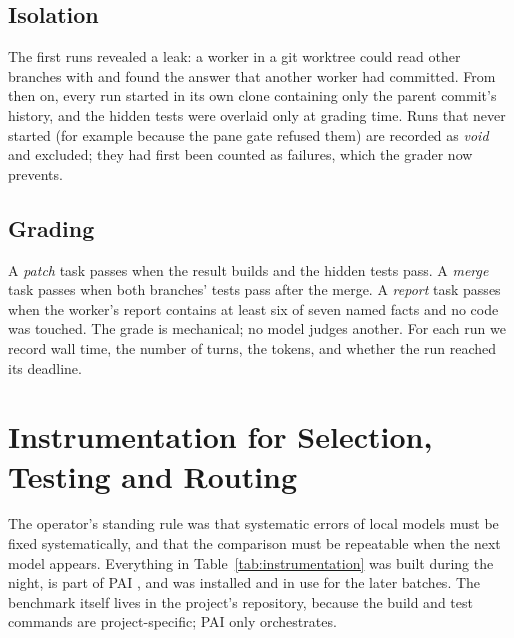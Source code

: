 \subsection{Isolation}

The first runs revealed a leak: a worker in a git worktree could read other branches with  and
found the answer that another worker had committed. From then on, every run started in its own clone containing only
the parent commit's history, and the hidden tests were overlaid only at grading time. Runs that never started (for
example because the pane gate refused them) are recorded as \emph{void} and excluded; they had first been counted as
failures, which the grader now prevents.

\subsection{Grading}

A \emph{patch} task passes when the result builds and the hidden tests pass. A \emph{merge} task passes when both
branches' tests pass after the merge. A \emph{report} task passes when the worker's report contains at least six of
seven named facts and no code was touched. The grade is mechanical; no model judges another. For each run we record
wall time, the number of turns, the tokens, and whether the run reached its deadline.

\section{Instrumentation for Selection, Testing and Routing}\label{sec:instrumentation}

The operator's standing rule was that systematic errors of local models must be fixed systematically, and that the
comparison must be repeatable when the next model appears. Everything in Table~\ref{tab:instrumentation} was built
during the night, is part of PAI \citep{Nott-2026aa}, and was installed and in use for the later batches. The
benchmark itself lives in the project's repository, because the build and test commands are project-specific; PAI only
orchestrates.

